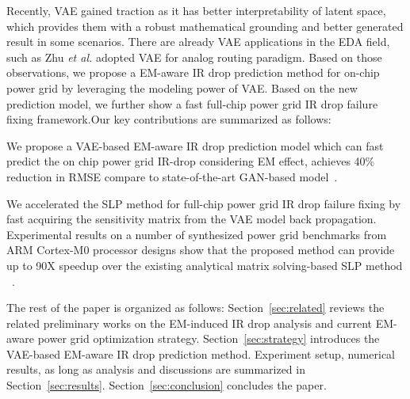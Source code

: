 Recently,  VAE  \cite{Diederik:arxiv'22} gained traction as it has better interpretability of latent space, which provides them with a robust mathematical grounding and better generated result in some scenarios. There are already VAE applications in the EDA field, such as Zhu {\it et al.} \cite{Zhu:ICCAD'19} adopted VAE for analog routing paradigm.
Based on those observations, we propose a EM-aware IR drop prediction method for on-chip power grid by leveraging the modeling power of VAE. Based on the new prediction model, we further show a fast full-chip power grid IR drop failure fixing framework.Our key contributions are summarized as follows:

\begin{itemlist}
\item We propose a VAE-based EM-aware IR drop prediction model which can fast predict the on chip power grid IR-drop considering EM effect, achieves 40$\%$ reduction in RMSE compare to state-of-the-art GAN-based model~\cite{ZhouJin:ICCAD'20}.

\item We accelerated the SLP method for full-chip power grid IR drop failure fixing by fast acquiring the sensitivity matrix from the VAE model back propagation.  Experimental results on a number of synthesized power grid benchmarks from ARM Cortex-M0 processor designs show that the proposed method can provide up to 90X speedup over the existing analytical matrix solving-based SLP method ~\cite{Sukharev:2019pg}.
 
\end{itemlist}

The rest of the paper is organized as follows: Section~\ref{sec:related} reviews the related preliminary works on the EM-induced IR drop analysis and current EM-aware power grid optimization strategy. Section~\ref{sec:strategy} introduces the VAE-based EM-aware IR drop prediction method. Experiment setup, numerical results, as long as analysis and discussions are summarized in Section~\ref{sec:results}.  Section~\ref{sec:conclusion} concludes the paper.